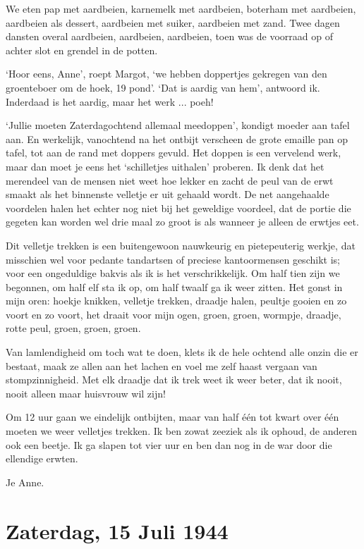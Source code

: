 \documentclass{book}
\begin{document}
We eten pap met aardbeien, karnemelk met aardbeien, boterham met aardbeien,
aardbeien als dessert, aardbeien met suiker, aardbeien met zand. Twee dagen
dansten overal aardbeien, aardbeien, aardbeien, toen was de voorraad op of
achter slot en grendel in de potten.

`Hoor eens, Anne', roept Margot, `we hebben doppertjes gekregen van den
groenteboer om de hoek, 19 pond'. `Dat is aardig van hem', antwoord ik.
Inderdaad is het aardig, maar het werk ... poeh!

`Jullie moeten Zaterdagochtend allemaal meedoppen', kondigt moeder aan tafel
aan. En werkelijk, vanochtend na het ontbijt verscheen de grote emaille pan op
tafel, tot aan de rand met doppers gevuld. Het doppen is een vervelend werk,
maar dan moet je eens het `schilletjes uithalen' proberen. Ik denk dat het
merendeel van de mensen niet weet hoe lekker en zacht de peul van de erwt smaakt
als het binnenste velletje er uit gehaald wordt. De net aangehaalde voordelen
halen het echter nog niet bij het geweldige voordeel, dat de portie die gegeten
kan worden wel drie maal zo groot is als wanneer je alleen de erwtjes eet.

Dit velletje trekken is een buitengewoon nauwkeurig en pietepeuterig werkje, dat
misschien wel voor pedante tandartsen of preciese kantoormensen geschikt is;
voor een ongeduldige bakvis als ik is het verschrikkelijk. Om half tien zijn we
begonnen, om half elf sta ik op, om half twaalf ga ik weer zitten. Het gonst in
mijn oren: hoekje knikken, velletje trekken, draadje halen, peultje gooien en zo
voort en zo voort, het draait voor mijn ogen, groen, groen, wormpje, draadje,
rotte peul, groen, groen, groen.

Van lamlendigheid om toch wat te doen, klets ik de hele ochtend alle onzin die
er bestaat, maak ze allen aan het lachen en voel me zelf haast vergaan van
stompzinnigheid. Met elk draadje dat ik trek weet ik weer beter, dat ik nooit,
nooit alleen maar huisvrouw wil zijn!

Om 12 uur gaan we eindelijk ontbijten, maar van half één tot kwart over één
moeten we weer velletjes trekken. Ik ben zowat zeeziek als ik ophoud, de anderen
ook een beetje. Ik ga slapen tot vier uur en ben dan nog in de war door die
ellendige erwten.

Je Anne.

\section*{Zaterdag, 15 Juli 1944}
\end{document}
